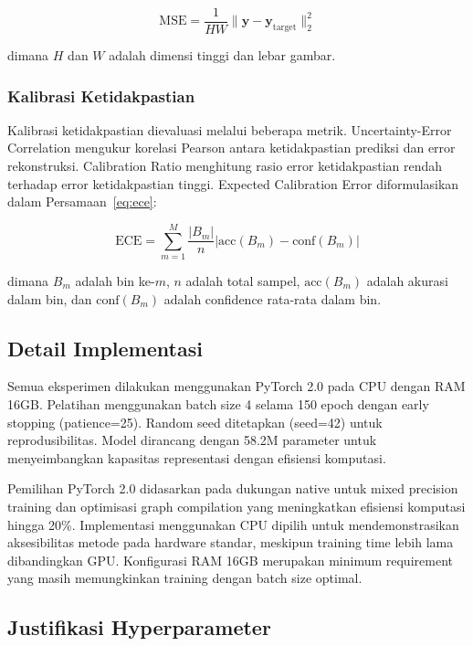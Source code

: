 \begin{equation}
\text{MSE} = \frac{1}{HW}\|\mathbf{y} - \mathbf{y}_{\text{target}}\|_2^2
\label{eq:mse}
\end{equation}

dimana $H$ dan $W$ adalah dimensi tinggi dan lebar gambar.

\subsubsection{Kalibrasi Ketidakpastian}
Kalibrasi ketidakpastian dievaluasi melalui beberapa metrik. Uncertainty-Error Correlation mengukur korelasi Pearson antara ketidakpastian prediksi dan error rekonstruksi. Calibration Ratio menghitung rasio error ketidakpastian rendah terhadap error ketidakpastian tinggi. Expected Calibration Error diformulasikan dalam Persamaan~\ref{eq:ece}:

\begin{equation}
\text{ECE} = \sum_{m=1}^M \frac{|B_m|}{n}|\text{acc}(B_m) - \text{conf}(B_m)|
\label{eq:ece}
\end{equation}

dimana $B_m$ adalah bin ke-$m$, $n$ adalah total sampel, $\text{acc}(B_m)$ adalah akurasi dalam bin, dan $\text{conf}(B_m)$ adalah confidence rata-rata dalam bin.

\subsection{Detail Implementasi}

Semua eksperimen dilakukan menggunakan PyTorch 2.0 pada CPU dengan RAM 16GB. Pelatihan menggunakan batch size 4 selama 150 epoch dengan early stopping (patience=25). Random seed ditetapkan (seed=42) untuk reprodusibilitas. Model dirancang dengan 58.2M parameter untuk menyeimbangkan kapasitas representasi dengan efisiensi komputasi.

Pemilihan PyTorch 2.0 didasarkan pada dukungan native untuk mixed precision training dan optimisasi graph compilation yang meningkatkan efisiensi komputasi hingga 20\%. Implementasi menggunakan CPU dipilih untuk mendemonstrasikan aksesibilitas metode pada hardware standar, meskipun training time lebih lama dibandingkan GPU. Konfigurasi RAM 16GB merupakan minimum requirement yang masih memungkinkan training dengan batch size optimal.

\subsection{Justifikasi Hyperparameter}

